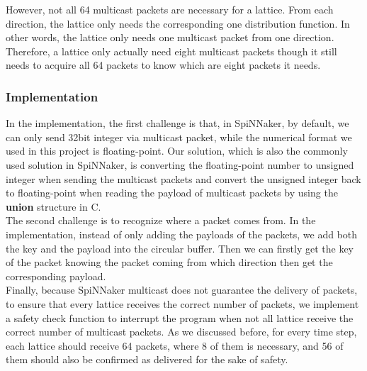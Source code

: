 However, not all 64 multicast packets are necessary for a lattice. From each direction, the lattice only needs the corresponding one distribution function. In other words, the lattice only needs one multicast packet from one direction. Therefore, a lattice only actually need eight multicast packets though it still needs to acquire all 64 packets to know which are eight packets it needs.\\

\subsubsection{Implementation}
In the implementation, the first challenge is that, in SpiNNaker, by default, we can only send 32bit integer via multicast packet, while the numerical format we used in this project is floating-point. Our solution, which is also the commonly used solution in SpiNNaker, is converting the floating-point number to unsigned integer when sending the multicast packets and convert the unsigned integer back to floating-point when reading the payload of multicast packets by using the \textbf{union} structure in C.\\

The second challenge is to recognize where a packet comes from. In the implementation, instead of only adding the payloads of the packets, we add both the key and the payload into the circular buffer. Then we can firstly get the key of the packet knowing the packet coming from which direction then get the corresponding payload.\\

Finally, because SpiNNaker multicast does not guarantee the delivery of packets, to ensure that every lattice receives the correct number of packets, we implement a safety check function to interrupt the program when not all lattice receive the correct number of multicast packets. As we discussed before, for every time step, each lattice should receive 64 packets, where 8 of them is necessary, and 56 of them should also be confirmed as delivered for the sake of safety.\\


